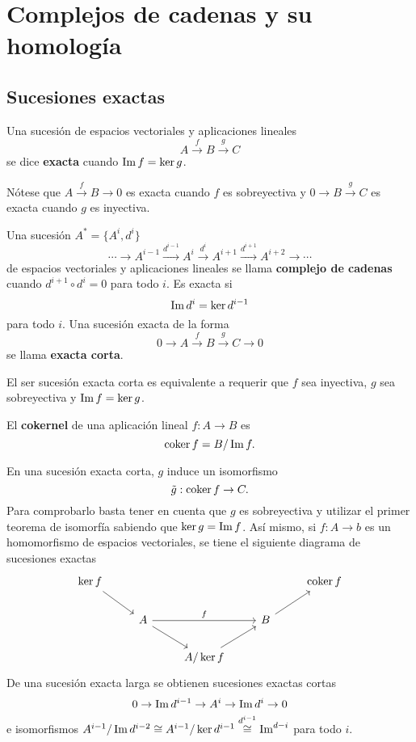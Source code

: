 \documentclass[CV.tex]{subfiles}
\begin{document}

\chapter{Complejos de cadenas y su homología}
\section{Sucesiones exactas}
\begin{defi}
Una sucesión de espacios vectoriales y aplicaciones lineales 
\[
A\overset{f}{\to}B\overset{g}{\to}C
\]
se dice \textbf{exacta} cuando $\operatorname{Im}{f}=\ker{g}$.
\end{defi}

Nótese que $A\overset{f}{\to}B\to 0$ es exacta cuando $f$ es sobreyectiva y $0\to B\overset{g}{\to}C$ es exacta cuando $g$ es inyectiva.

\begin{defi}
Una sucesión $A^*=\{A^i, d^i\}$
\[
\cdots\to A^{i-1}\overset{d^{i-1}}{\to}A^i\overset{d^i}{\to}A^{i+1}\overset{d^{i+1}}{\to}A^{i+2}\to\cdots
\]
de espacios vectoriales y aplicaciones lineales se llama \textbf{complejo de cadenas} cuando $d^{i+1}\circ d^i=0$ para todo $i$. Es exacta si
\[
\operatorname{Im}{d^i}=\ker{d^{i-1}}
\]
para todo $i$. Una sucesión exacta de la forma
\[
0\to A\overset{f}{\to}B\overset{g}{\to}C\to 0
\]
se llama \textbf{exacta corta}.
\end{defi}

El ser sucesión exacta corta es equivalente a requerir que $f$ sea inyectiva, $g$ sea sobreyectiva y $\operatorname{Im}{f}=\ker{g}$.

\begin{defi}
El \textbf{cokernel} de una aplicación lineal $f:A\to B$ es
\[
\operatorname{coker}{f}=B/\operatorname{Im}{f}.
\]
\end{defi}


En una sucesión exacta corta, $g$ induce un isomorfismo
\[
\tilde{g}:\operatorname{coker}{f}\to C.
\]
Para comprobarlo basta tener en cuenta que $g$ es sobreyectiva y utilizar el primer teorema de isomorfía sabiendo que $\ker{g}=\operatorname{Im}{f}$. Así mismo, si $f:A\to b$ es un homomorfismo de espacios vectoriales, se tiene el siguiente diagrama de sucesiones exactas
\[
\begin{tikzcd}
\ker{f}\arrow[dr] & &  & & \coker{f}\\
& A\arrow[rr,"f"]\arrow[dr] & & B\arrow[ur] & \\
& & A/\ker{f}\arrow[ur] & &
\end{tikzcd}
\]
De una sucesión exacta larga se obtienen sucesiones exactas cortas
\[
0\to \operatorname{Im}{d^{i-1}}\to  A^i\to \operatorname{Im}{d^i}\to 0
\]
e isomorfismos $A^{i-1}/\operatorname{Im}{d^{i-2}}\cong A^{i-1}/\ker{d^{i-1}}\overset{d^{i-1}}{\cong}\operatorname{Im}^{d-i}$ para todo $i$. 
\end{document}
